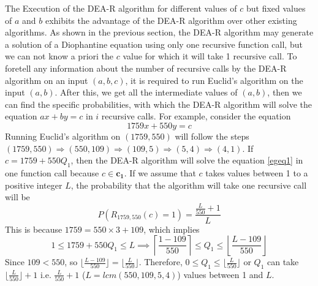 \documentclass[pdflatex,sn-mathphys-num]{sn-jnl}%
\theoremstyle{thmstyleone}%
\theoremstyle{thmstyletwo}%
\theoremstyle{thmstylethree}%
\begin{document}
\par The Execution of the DEA-R algorithm for different values of $c$ but fixed values of $a$ and $b$ exhibits the advantage of the DEA-R algorithm over other existing algorithms. As shown in the previous section, the DEA-R algorithm may generate a solution of a  Diophantine equation using only one recursive function call, but we can not know a priori the $c$ value for which it will take 1 recursive call. To foretell any information about the number of recursive calls by the DEA-R algorithm on an input  $(a,b,c)$, it is required to run Euclid's algorithm on the input $(a,b)$. After this, we get all the intermediate values of $(a,b)$, then we can find the specific probabilities, with which the DEA-R algorithm will solve the equation $ax+by=c$  in $i$ recursive calls. For example, consider the equation 
\begin{equation}
\label{egeq1}    1759x+550y=c
\end{equation}  Running  Euclid's algorithm on $(1759,550)$ will follow the steps $(1759,550) \Rightarrow (550,109) \Rightarrow (109,5)\Rightarrow (5,4)\Rightarrow(4,1)$. If $c=1759+550Q_1$, then the DEA-R algorithm will solve the equation \ref{egeq1} in one function call because $c \in \mathbf{c_1}$.  If we assume that $c$ takes values between 1 to a positive integer $L$, the probability that the algorithm will take one recursive call will be
$$P(R_{1759,550}(c)=1)=\frac{\frac{L}{550}+1}{L}$$
This is because $1759=550\times 3+109$, which implies
$$1 \le 1759+ 550Q_1 \le L \implies \left\lceil \frac{1-109}{550} \right\rceil \le Q_1 \le \left \lfloor \frac{L-109}{550}\right\rfloor$$
Since $109 < 550$, so $\lfloor\frac{L-109}{550}\rfloor=\lfloor\frac{L}{550}\rfloor$. Therefore, $0 \le Q_1 \le \lfloor\frac{L}{550} \rfloor$ or $Q_1$ can take $\lfloor\frac{L}{550} \rfloor+1$ i.e. $\frac{L}{550}+1$ \newline($L=lcm(550,109,5,4)$) values between 1 and $L$.

 
\end{document}
